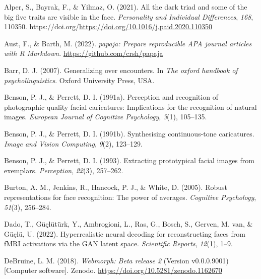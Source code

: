 \documentclass[
  doc,floatsintext]{apa6}
\newlength{\cslhangindent}
\newlength{\cslentryspacingunit} %
\newenvironment{CSLReferences}[2] %
 {%
  \setlength{\parindent}{0pt}
  \ifodd #1
  \let\oldpar\par
  \def\par{\hangindent=\cslhangindent\oldpar}
  \fi
  \setlength{\parskip}{#2\cslentryspacingunit}
 }%
 {}
\begin{document}
\hypertarget{refs}{}
\begin{CSLReferences}{1}{0}
\leavevmode{}%
Alper, S., Bayrak, F., \& Yilmaz, O. (2021). All the dark triad and some of the big five traits are visible in the face. \emph{Personality and Individual Differences}, \emph{168}, 110350. https://doi.org/\url{https://doi.org/10.1016/j.paid.2020.110350}

\leavevmode{}%
Aust, F., \& Barth, M. (2022). \emph{{papaja}: {Prepare} reproducible {APA} journal articles with {R Markdown}}. \url{https://github.com/crsh/papaja}

\leavevmode{}%
Barr, D. J. (2007). Generalizing over encounters. In \emph{The oxford handbook of psycholinguistics}. Oxford University Press, USA.

\leavevmode{}%
Benson, P. J., \& Perrett, D. I. (1991a). Perception and recognition of photographic quality facial caricatures: Implications for the recognition of natural images. \emph{European Journal of Cognitive Psychology}, \emph{3}(1), 105--135.

\leavevmode{}%
Benson, P. J., \& Perrett, D. I. (1991b). Synthesising continuous-tone caricatures. \emph{Image and Vision Computing}, \emph{9}(2), 123--129.

\leavevmode{}%
Benson, P. J., \& Perrett, D. I. (1993). Extracting prototypical facial images from exemplars. \emph{Perception}, \emph{22}(3), 257--262.

\leavevmode{}%
Burton, A. M., Jenkins, R., Hancock, P. J., \& White, D. (2005). Robust representations for face recognition: The power of averages. \emph{Cognitive Psychology}, \emph{51}(3), 256--284.

\leavevmode{}%
Dado, T., Güçlütürk, Y., Ambrogioni, L., Ras, G., Bosch, S., Gerven, M. van, \& Güçlü, U. (2022). Hyperrealistic neural decoding for reconstructing faces from fMRI activations via the GAN latent space. \emph{Scientific Reports}, \emph{12}(1), 1--9.

\leavevmode{}%
DeBruine, L. M. (2018). \emph{Webmorph: Beta release 2} (Version v0.0.0.9001) {[}Computer software{]}. Zenodo. \url{https://doi.org/10.5281/zenodo.1162670}


\end{CSLReferences}
\end{document}
